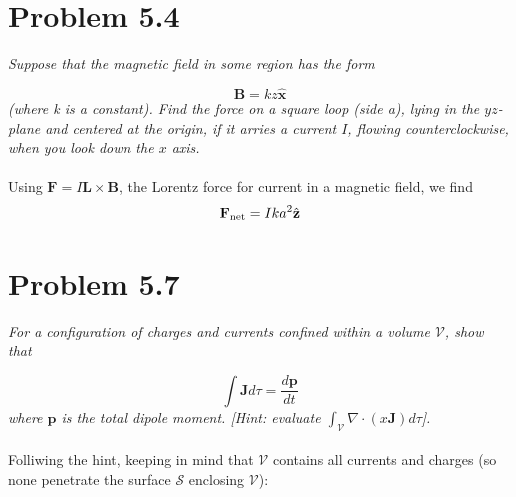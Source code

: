 \documentclass[10pt]{article}
\begin{document}
\maketitle

\section{Problem 5.4}

\textit{Suppose that the magnetic field in some region has the form}

\begin{equation}
\mathbf{B} = kz \hat{\mathbf{x}}
\end{equation}
\noindent
\textit{(where k is a constant).  Find the force on a square loop (side a), lying in the $yz$-plane and centered at the origin, if it arries a current $I$, flowing counterclockwise, when you look down the $x$ axis.} \\ \\
Using $\mathbf{F} = I\mathbf{L} \times \mathbf{B}$, the Lorentz force for current in a magnetic field, we find 
\begin{equation}
\mathbf{F}_{\rm net} = Ika^2\hat{\mathbf{z}}
\end{equation}

\section{Problem 5.7}

\textit{For a configuration of charges and currents confined within a volume $\mathcal{V}$, show that}

\begin{equation}
\int \mathbf{J} d\tau = \frac{d\mathbf{p}}{dt}
\end{equation}
\noindent
\textit{where $\mathbf{p}$ is the total dipole moment. [Hint: evaluate $\int_\mathcal{V} \nabla \cdot (x \mathbf{J}) d\tau$].} \\ \\
\noindent
Folliwing the hint, keeping in mind that $\mathcal{V}$ contains all currents and charges (so none penetrate the surface $\mathcal{S}$ enclosing $\mathcal{V}$):
\end{document}
